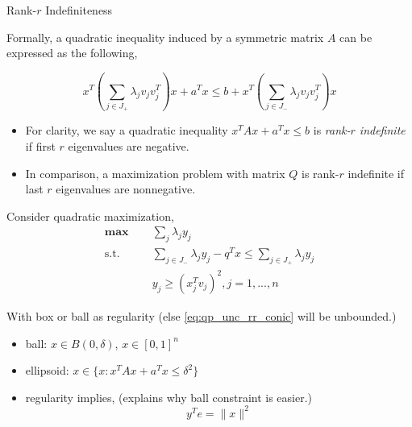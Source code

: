 \documentclass[aspectratio=1610, 9pt]{beamer}
\newcommand{\mx}{\mathbf{\max}\;}
\newcommand{\st}{\mathrm{s.t.\;}}
\begin{document}
\begin{frame}[allowframebreaks]{Rank-\(r\) Indefiniteness}

  Formally, a quadratic inequality induced by a symmetric matrix \(A\) can be expressed as the following,

  \begin{equation}
    x^T \left(\sum_{j\in J_+} \lambda_j v_jv_j^T\right)x +a^Tx \le b + x^T\left(\sum_{j\in J_-} \lambda_j v_jv_j^T\right)x
  \end{equation}

  \begin{itemize}
    \item For clarity, we say a quadratic inequality \(x^TAx + a^Tx \le b\) is \emph{rank-\(r\) indefinite} if first \(r\) eigenvalues are negative.
    \item In comparison, a maximization problem with matrix \(Q\) is rank-\(r\) indefinite if last \(r\) eigenvalues are nonnegative.
  \end{itemize}

  \framebreak

  Consider quadratic maximization,
  \begin{equation}\label{eq:qp_unc_rr_conic}
    \begin{aligned}
      \mx \quad & \sum_j \lambda_j y_j                                                             \\
      \st \quad & \sum_{j \in J_{-}} \lambda_{j} y_j - q^T x \le  \sum_{j \in J_{+}} \lambda_j y_j \\
                & y_j \ge (x_j^T v_j)^2, j= 1, ..., n
    \end{aligned}
  \end{equation}

  With box or ball as regularity (else \eqref{eq:qp_unc_rr_conic} will be unbounded.)
  \begin{itemize}
    \item ball: \(x\in B(0, \delta)\), \(x\in [0, 1]^n\)
    \item ellipsoid: \(x \in \{x: x^TAx + a^Tx \le \delta^2\}\)
    \item regularity implies, (explains why ball constraint is easier.)
          \begin{equation}
            y^Te = \|x\|^2
          \end{equation}
  \end{itemize}
\end{frame}
\end{document}

